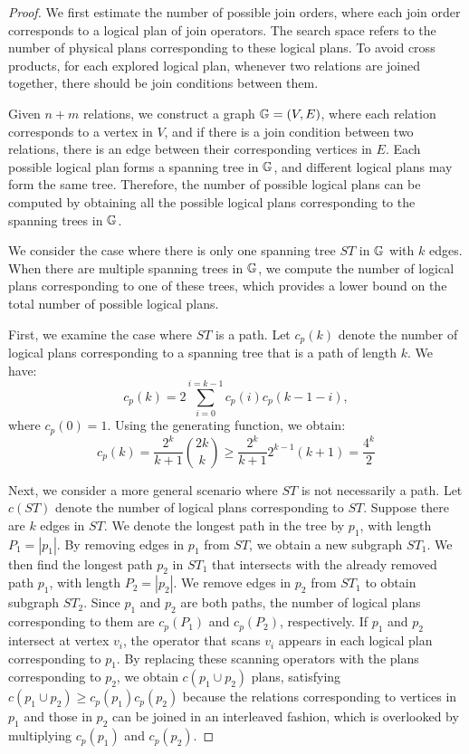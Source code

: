 \begin{proof}
    We first estimate the number of possible join orders, where each join order corresponds to a logical plan of join operators. The search space refers to the number of physical plans corresponding to these logical plans. To avoid cross products, for each explored logical plan, whenever two relations are joined together, there should be join conditions between them.

    Given $n + m$ relations, we construct a graph $\mathbb{G} = (V, E)$, where each relation corresponds to a vertex in $V$, and if there is a join condition between two relations, there is an edge between their corresponding vertices in $E$. Each possible logical plan forms a spanning tree in $\mathbb{G}$, and different logical plans may form the same tree. Therefore, the number of possible logical plans can be computed by obtaining all the possible logical plans corresponding to the spanning trees in $\mathbb{G}$.

    We consider the case where there is only one spanning tree $ST$ in $\mathbb{G}$ with $k$ edges. When there are multiple spanning trees in $\mathbb{G}$, we compute the number of logical plans corresponding to one of these trees, which provides a lower bound on the total number of possible logical plans.

    First, we examine the case where $ST$ is a path. Let $c_p(k)$ denote the number of logical plans corresponding to a spanning tree that is a path of length $k$. We have:
    \begin{equation*}
        c_p(k) = 2\sum_{i=0}^{i=k-1}c_p(i)c_p(k-1-i),
    \end{equation*}
    where $c_p(0) = 1$. Using the generating function, we obtain:
    \begin{equation*}
        c_p(k) = \frac{2^k}{k+1}\binom{2k}{k} \geq \frac{2^k}{k+1}2^{k-1}(k+1) = \frac{4^k}{2}
    \end{equation*}

    Next, we consider a more general scenario where $ST$ is not necessarily a path. Let $c(ST)$ denote the number of logical plans corresponding to $ST$. Suppose there are $k$ edges in $ST$. We denote the longest path in the tree by $p_1$, with length $P_1 = |p_1|$. By removing edges in $p_1$ from $ST$, we obtain a new subgraph $ST_1$. We then find the longest path $p_2$ in $ST_1$ that intersects with the already removed path $p_1$, with length $P_2 = |p_2|$. We remove edges in $p_2$ from $ST_1$ to obtain subgraph $ST_2$. Since $p_1$ and $p_2$ are both paths, the number of logical plans corresponding to them are $c_p(P_1)$ and $c_p(P_2)$, respectively. If $p_1$ and $p_2$ intersect at vertex $v_i$, the operator that scans $v_i$ appears in each logical plan corresponding to $p_1$. By replacing these scanning operators with the plans corresponding to $p_2$, we obtain $c(p_1 \cup p_2)$ plans, satisfying $c(p_1 \cup p_2) \geq c_p(p_1)c_p(p_2)$ because the relations corresponding to vertices in $p_1$ and those in $p_2$ can be joined in an interleaved fashion, which is overlooked by multiplying $c_p(p_1)$ and $c_p(p_2)$.


\end{proof}
